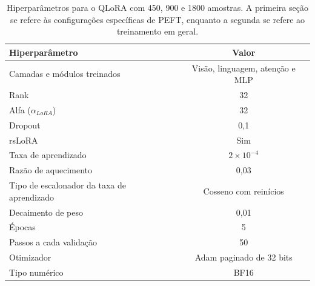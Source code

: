 \begin{table}[ht]
    \caption{\small Hiperparâmetros para o \ac{QLoRA} com 450, 900 e 1800 amostras. A primeira seção se refere às configurações específicas de \ac{PEFT}, enquanto a
    segunda se refere ao treinamento em geral.}
    \centering
    \begin{tabular}{l|c}
        \hline
        Hiperparâmetro                             & Valor                                  \\ \hline
        Camadas e módulos treinados                & Visão, linguagem, atenção e \ac{MLP}   \\
        Rank                                       & 32                                     \\
        Alfa (\begin{math}\alpha_{LoRA}\end{math}) & 32                                     \\
        Dropout                                    & 0,1                                    \\
        \ac{rsLoRA}                                & Sim                                    \\ \hline
        Taxa de aprendizado                        & \begin{math}2 \times 10^{-4}\end{math} \\
        Razão de aquecimento                       & 0,03                                   \\
        Tipo de escalonador da taxa de aprendizado & Cosseno com reinícios                  \\
        Decaimento de peso                         & 0,01                                   \\
        Épocas                                     & 5                                      \\
        Passos a cada validação                    & 50                                     \\
        Otimizador                                 & \ac{Adam} paginado de 32 bits          \\
        Tipo numérico                              & \ac{BF16}                              \\ \hline
    \end{tabular}
    \label{tab:qlora_500_config}
\end{table}

